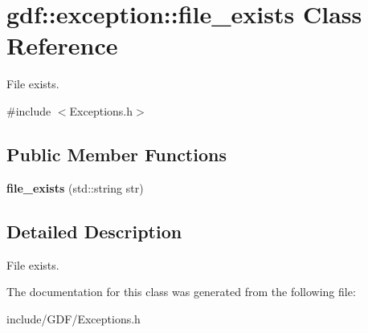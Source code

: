 \hypertarget{classgdf_1_1exception_1_1file__exists}{
\section{gdf::exception::file\_\-exists Class Reference}
\label{classgdf_1_1exception_1_1file__exists}
}


File exists.  




{\ttfamily \#include $<$Exceptions.h$>$}

\subsection*{Public Member Functions}
\begin{DoxyCompactItemize}
\item 
\hypertarget{classgdf_1_1exception_1_1file__exists_afaa7a02685aa12445cabf4c47ceece3e}{
{\bfseries file\_\-exists} (std::string str)}
\label{classgdf_1_1exception_1_1file__exists_afaa7a02685aa12445cabf4c47ceece3e}

\end{DoxyCompactItemize}


\subsection{Detailed Description}
File exists. 

The documentation for this class was generated from the following file:\begin{DoxyCompactItemize}
\item 
include/GDF/Exceptions.h\end{DoxyCompactItemize}
